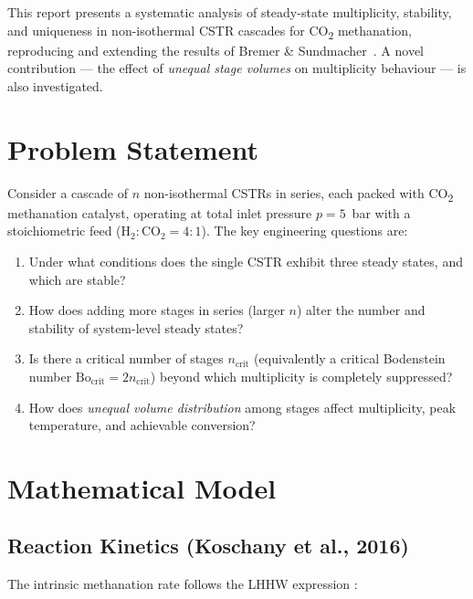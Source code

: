 \documentclass[11pt,a4paper]{article}
\newcommand{\Bo}{\mathrm{Bo}}
\begin{document}
This report presents a systematic analysis of steady-state multiplicity,
stability, and uniqueness in non-isothermal CSTR cascades for CO\textsubscript{2}
methanation, reproducing and extending the results of Bremer \&
Sundmacher~\cite{bremer2021}. A novel contribution — the effect of
\textit{unequal stage volumes} on multiplicity behaviour — is also investigated.

\section{Problem Statement}
\label{sec:problem}

Consider a cascade of $n$ non-isothermal CSTRs in series, each packed with
CO\textsubscript{2} methanation catalyst, operating at total inlet pressure
$p=5$~bar with a stoichiometric feed ($\mathrm{H_2:CO_2}=4:1$). The key
engineering questions are:

\begin{enumerate}[leftmargin=1.6em,itemsep=1pt]
  \item Under what conditions does the single CSTR exhibit three steady states,
        and which are stable?
  \item How does adding more stages in series (larger $n$) alter the number and
        stability of system-level steady states?
  \item Is there a critical number of stages $n_\mathrm{crit}$ (equivalently a
        critical Bodenstein number $\Bo_\mathrm{crit}=2n_\mathrm{crit}$) beyond
        which multiplicity is completely suppressed?
  \item How does \textit{unequal volume distribution} among stages affect
        multiplicity, peak temperature, and achievable conversion?
\end{enumerate}

\section{Mathematical Model}
\label{sec:model}

\subsection{Reaction Kinetics (Koschany et al., 2016)}
\label{sec:kinetics}

The intrinsic methanation rate follows the LHHW expression
\cite{koschany2016}:
\end{document}
